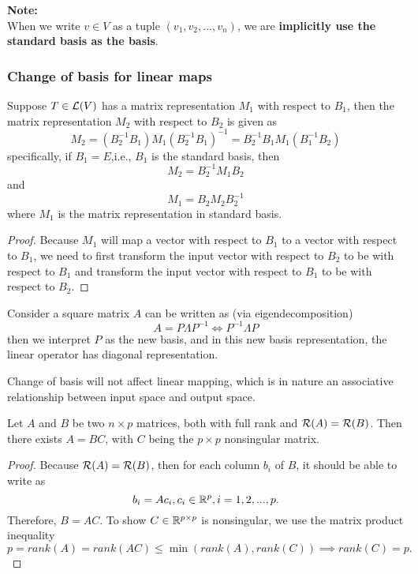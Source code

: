 \begin{refsection}
\begin{mdframed}
\textbf{Note:}\\
When we write $v\in V$ as a tuple $(v_1,v_2,...,v_n)$, we are \textbf{implicitly use the standard basis as the basis}. 
\end{mdframed}

\subsubsection{Change of basis for linear maps}

\begin{theorem}\label{ch:linearalgebra:th:changeofbasis}
Suppose $T\in \mathcal{L}(V)$ has a matrix representation $M_1$ with respect to $B_1$, then the matrix representation $M_2$ with respect to $B_2$ is given as
$$M_2 = (B_2^{-1}B_1)M_1(B_2^{-1}B_1)^{-1} = B_2^{-1}B_1M_1(B_1^{-1}B_2)$$
specifically, if $B_1 = E$,i.e., $B_1$ is the standard basis, then
$$M_2 = B_2^{-1}M_1B_2$$
and 
$$M_1 = B_2M_2B_2^{-1}$$
where $M_1$ is the matrix representation in standard basis.
\end{theorem}

\begin{proof}
Because $M_1$ will map a vector with respect to $B_1$ to a vector with respect to $B_1$, we need to first transform the input vector with respect to $B_2$ to be with respect to $B_1$ and transform the input vector with respect to $B_1$ to be with respect to $B_2$. 
\end{proof}




\begin{remark}
Consider a square matrix $A$ can be written as (via eigendecomposition) 
$$A = P\Lambda P^{-1} \Leftrightarrow P^{-1}\Lambda P$$
then we interpret $P$ as the new basis, and in this new basis representation, the linear operator has diagonal representation.
\end{remark}




\begin{remark}
Change of basis will not affect linear mapping, which is in nature an associative relationship between input space and output space. 
\end{remark}

\begin{lemma}\label{ch:linearalgebra:th:changeBasisSubspaceRepresentation}
Let $A$ and $B$ be two $n\times p$ matrices, both with full rank and $\mathcal{R}(A) = \mathcal{R}(B)$. Then there exists $A = BC$, with $C$ being the $p\times p$ nonsingular matrix.	
\end{lemma}
\begin{proof}
Because $\mathcal{R}(A) = \mathcal{R}(B)$, then for each column $b_i$ of $B$, it should be able to write as
$$b_i = Ac_i,c_i\in \mathbb{R}^p, i = 1,2,...,p.$$
Therefore, $B = AC$. To show $C \in \mathbb{R}^{p\times p}$ is nonsingular, we use the matrix product inequality
$$p = rank(A) = rank(AC)\leq \min(rank(A),rank(C)) \implies rank(C) = p.$$ 	
\end{proof}



\end{refsection}
